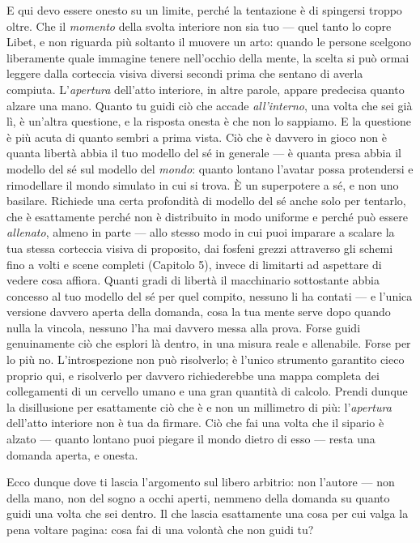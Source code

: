 \documentclass[11pt, twoside, openright]{book}
\begin{document}
E qui devo essere onesto su un limite, perché la tentazione è di spingersi troppo oltre. Che il \textit{momento} della svolta interiore non sia tuo --- quel tanto lo copre Libet, e non riguarda più soltanto il muovere un arto: quando le persone scelgono liberamente quale immagine tenere nell'occhio della mente, la scelta si può ormai leggere dalla corteccia visiva diversi secondi prima che sentano di averla compiuta. L'\textit{apertura} dell'atto interiore, in altre parole, appare predecisa quanto alzare una mano. Quanto tu guidi ciò che accade \textit{all'interno}, una volta che sei già lì, è un'altra questione, e la risposta onesta è che non lo sappiamo. E la questione è più acuta di quanto sembri a prima vista. Ciò che è davvero in gioco non è quanta libertà abbia il tuo modello del sé in generale --- è quanta presa abbia il modello del sé sul modello del \textit{mondo}: quanto lontano l'avatar possa protendersi e rimodellare il mondo simulato in cui si trova. È un superpotere a sé, e non uno basilare. Richiede una certa profondità di modello del sé anche solo per tentarlo, che è esattamente perché non è distribuito in modo uniforme e perché può essere \textit{allenato}, almeno in parte --- allo stesso modo in cui puoi imparare a scalare la tua stessa corteccia visiva di proposito, dai fosfeni grezzi attraverso gli schemi fino a volti e scene completi (Capitolo 5), invece di limitarti ad aspettare di vedere cosa affiora. Quanti gradi di libertà il macchinario sottostante abbia concesso al tuo modello del sé per quel compito, nessuno li ha contati --- e l'unica versione davvero aperta della domanda, cosa la tua mente serve dopo quando nulla la vincola, nessuno l'ha mai davvero messa alla prova. Forse guidi genuinamente ciò che esplori là dentro, in una misura reale e allenabile. Forse per lo più no. L'introspezione non può risolverlo; è l'unico strumento garantito cieco proprio qui, e risolverlo per davvero richiederebbe una mappa completa dei collegamenti di un cervello umano e una gran quantità di calcolo. Prendi dunque la disillusione per esattamente ciò che è e non un millimetro di più: l'\textit{apertura} dell'atto interiore non è tua da firmare. Ciò che fai una volta che il sipario è alzato --- quanto lontano puoi piegare il mondo dietro di esso --- resta una domanda aperta, e onesta.

Ecco dunque dove ti lascia l'argomento sul libero arbitrio: non l'autore --- non della mano, non del sogno a occhi aperti, nemmeno della domanda su quanto guidi una volta che sei dentro. Il che lascia esattamente una cosa per cui valga la pena voltare pagina: cosa fai di una volontà che non guidi tu?
\end{document}
